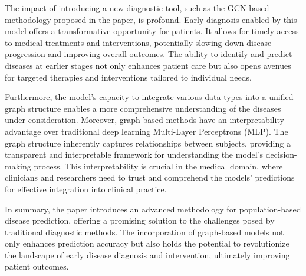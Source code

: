 The impact of introducing a new diagnostic tool, such as the GCN-based methodology proposed in the paper, is profound. Early diagnosis enabled by this model offers a transformative opportunity for patients. It allows for timely access to medical treatments and interventions, potentially slowing down disease progression and improving overall outcomes. The ability to identify and predict diseases at earlier stages not only enhances patient care but also opens avenues for targeted therapies and interventions tailored to individual needs.

Furthermore, the model's capacity to integrate various data types into a unified graph structure enables a more comprehensive understanding of the diseases under consideration. Moreover, graph-based methods have an interpretability advantage over traditional deep learning Multi-Layer Perceptrons (MLP). The graph structure inherently captures relationships between subjects, providing a transparent and interpretable framework for understanding the model's decision-making process. This interpretability is crucial in the medical domain, where clinicians and researchers need to trust and comprehend the models' predictions for effective integration into clinical practice.

In summary, the paper introduces an advanced methodology for population-based disease prediction, offering a promising solution to the challenges posed by traditional diagnostic methods. The incorporation of graph-based models not only enhances prediction accuracy but also holds the potential to revolutionize the landscape of early disease diagnosis and intervention, ultimately improving patient outcomes.